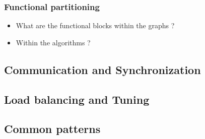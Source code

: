 \begin{frame}
  \frametitle{Functional partitioning}

  \begin{itemize}
  \item What are the functional blocks within the graphs ?
  \item Within the algorithms ?
  \end{itemize}
\end{frame}

\subsection{Communication and Synchronization}
\label{subsec:com}

\subsection{Load balancing and Tuning}
\label{subsec:label}

\subsection{Common patterns}
\label{subsec:parpatterns}
